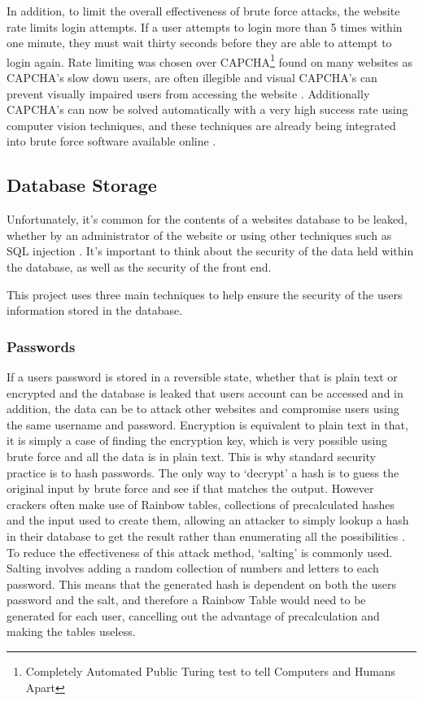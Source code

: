 In addition, to limit the overall effectiveness of brute force attacks, the website rate limits login attempts. If a user attempts to login more than 5 times within one minute, they must wait thirty seconds before they are able to attempt to login again.
%
Rate limiting was chosen over CAPCHA\footnote{Completely Automated Public Turing test to tell Computers and Humans Apart} found on many websites as CAPCHA's slow down users, are often illegible and visual CAPCHA's can prevent visually impaired users from accessing the website \parencite{matt2005inaccessibility, hegarty2012onlinesecurity}. Additionally CAPCHA's can now be solved automatically with a very high success rate using computer vision techniques, and these techniques are already being integrated into brute force software available online \parencite{goodfellow2013neuralnetwork, 9kweu2014captchasolver, danchev2014captcha, savinkin2012captchasolvers}. 

\subsection{Database Storage}
Unfortunately, it's common for the contents of a websites database to be leaked, whether by an administrator of the website or using other techniques such as SQL injection \parencite{bbc2012linkedinpasswords,chechik2013passwords}. It's important to think about the security of the data held within the database, as well as the security of the front end.

This project uses three main techniques to help ensure the security of the users information stored in the database.

\subsubsection{Passwords}
If a users password is stored in a reversible state, whether that is plain text or encrypted and the database is leaked that users account can be accessed and in addition, the data can be to attack other websites and compromise users using the same username and password.
%
Encryption is equivalent to plain text in that, it is simply a case of finding the encryption key, which is very possible using brute force and all the data is in plain text. 
%
This is why standard security practice is to hash passwords. The only way to `decrypt' a hash is to guess the original input by brute force and see if that matches the output.
%
However crackers often make use of Rainbow tables, collections of precalculated hashes and the input used to create them, allowing an attacker to simply lookup a hash in their database to get the result rather than enumerating all the possibilities \parencite{jorgensen2012}.
%
To reduce the effectiveness of this attack method, `salting' is commonly used. Salting involves adding a random collection of numbers and letters to each password. This means that the generated hash is dependent on both the users password and the salt, and therefore a Rainbow Table would need to be generated for each user, cancelling out the advantage of precalculation and making the tables useless.

